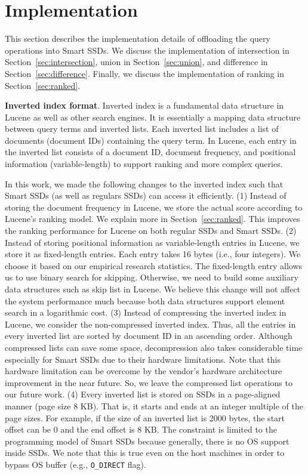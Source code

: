 
\section{Implementation}\label{sec:implementation}
This section describes the implementation details of offloading the query operations into Smart SSDs. We discuss the implementation of intersection in Section~\ref{sec:intersection}, union in Section~\ref{sec:union}, and difference in Section~\ref{sec:difference}. Finally, we discuss the implementation of ranking in Section~\ref{sec:ranked}.

\textbf{Inverted index format}.
Inverted index is a fundamental data structure in Lucene as well as other search engines.
It is essentially a mapping data structure between query terms and inverted lists.
Each inverted list includes a list of documents (document IDs) containing the query term.
In Lucene, each entry in the inverted list consists of a document ID, document frequency, and positional information (variable-length) to support ranking and more complex queries.

In this work, we made the following changes to the inverted index such that Smart SSDs (as well as regulars SSDs) can access it efficiently. (1) Instead of storing the document frequency in Lucene, we store the actual score according to Lucene's ranking model. We explain more in Section~\ref{sec:ranked}. This improves the ranking performance for Lucene on both regular SSDs and Smart SSDs.
(2) Instead of storing positional information as variable-length entries in Lucene, we store it as fixed-length entries. Each entry takes 16 bytes (i.e., four integers). We choose it based on our empirical research statistics. The fixed-length entry allows us to use binary search for skipping. Otherwise, we need to build some auxiliary data structures such as skip list in Lucene. We believe this change will not affect the system performance much because both data structures support element search in a logarithmic cost.
(3) Instead of compressing the inverted index in Lucene, we consider the non-compressed inverted index.
Thus, all the entries in every inverted list are sorted by document ID in an ascending order.
Although compressed lists can save some space, decompression also takes considerable time especially for Smart SSDs due to their hardware limitations. Note that this hardware limitation can be overcome by the vendor's hardware architecture improvement in the near future. So, we leave the compressed list operations to our future work.
(4) Every inverted list is stored on SSDs in a page-aligned manner (page size 8 KB). That is, it starts and ends at an integer multiple of the page sizes. For example, if the size of an inverted list is 2000 bytes, the start offset can be 0 and the end offset is 8 KB. The constraint is limited to the programming model of Smart SSDs because generally, there is no OS support inside SSDs. We note that this is true even on the host machines in order to bypass OS buffer (e.g., \verb"O_DIRECT" flag).


